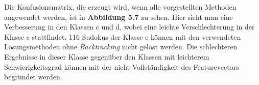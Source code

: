 \noindent Die Konfusionsmatrix, die erzeugt wird, wenn alle vorgestellten Methoden angewendet werden, ist in \textbf{Abbildung 5.7} zu sehen. Hier sieht man eine Verbesserung in den Klassen c und d, wobei eine leichte Verschlechterung in der Klasse e stattfindet. 116 Sudokus der Klasse e können mit den verwendeten Lösungsmethoden ohne \textit{Backtracking} nicht gelöst werden. Die schlechteren Ergebnisse in dieser Klasse gegenüber den Klassen mit leichterem Schwierigkeitsgrad können mit der nicht Vollständigkeit des Featurevectors begründet werden.
